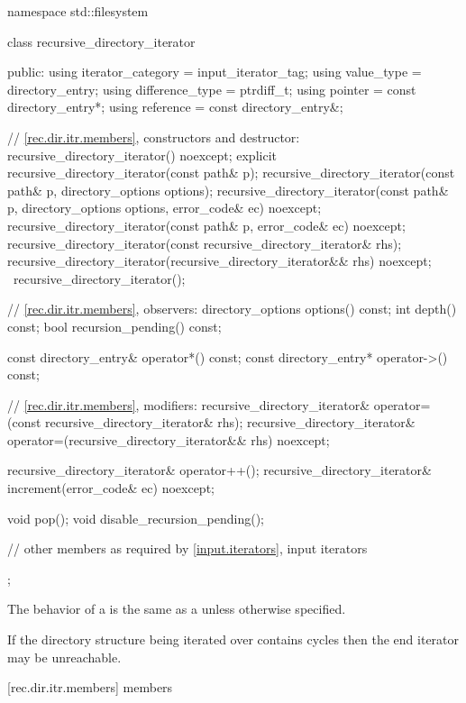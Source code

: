 \begin{codeblock}
namespace std::filesystem {
  class recursive_directory_iterator {
  public:
    using iterator_category = input_iterator_tag;
    using value_type        = directory_entry;
    using difference_type   = ptrdiff_t;
    using pointer           = const directory_entry*;
    using reference         = const directory_entry&;

    // \ref{rec.dir.itr.members}, constructors and destructor:
    recursive_directory_iterator() noexcept;
    explicit recursive_directory_iterator(const path& p);
    recursive_directory_iterator(const path& p, directory_options options);
    recursive_directory_iterator(const path& p, directory_options options,
                                 error_code& ec) noexcept;
    recursive_directory_iterator(const path& p, error_code& ec) noexcept;
    recursive_directory_iterator(const recursive_directory_iterator& rhs);
    recursive_directory_iterator(recursive_directory_iterator&& rhs) noexcept;
   ~recursive_directory_iterator();

    // \ref{rec.dir.itr.members}, observers:
    directory_options  options() const;
    int                depth() const;
    bool               recursion_pending() const;

    const directory_entry& operator*() const;
    const directory_entry* operator->() const;

    // \ref{rec.dir.itr.members}, modifiers:
    recursive_directory_iterator&
      operator=(const recursive_directory_iterator& rhs);
    recursive_directory_iterator&
      operator=(recursive_directory_iterator&& rhs) noexcept;

    recursive_directory_iterator& operator++();
    recursive_directory_iterator& increment(error_code& ec) noexcept;

    void pop();
    void disable_recursion_pending();

    // other members as required by \ref{input.iterators}, input iterators
  };
}
\end{codeblock}

\pnum
The behavior of a  is the same
as a  unless otherwise specified.

\pnum
\enternote If the directory structure being iterated over contains cycles
then the end iterator may be unreachable. \exitnote

[rec.dir.itr.members]{ members}

